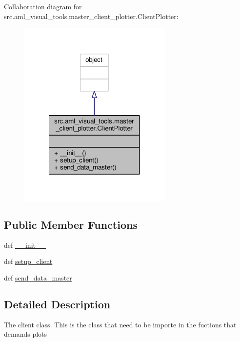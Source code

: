 Collaboration diagram for src.\-aml\-\_\-visual\-\_\-tools.\-master\-\_\-client\-\_\-plotter.\-Client\-Plotter\-:\nopagebreak
\begin{figure}[H]
\begin{center}
\leavevmode
\includegraphics[width=218pt]{classsrc_1_1aml__visual__tools_1_1master__client__plotter_1_1_client_plotter__coll__graph}
\end{center}
\end{figure}
\subsection*{Public Member Functions}
\begin{DoxyCompactItemize}
\item 
def \hyperlink{classsrc_1_1aml__visual__tools_1_1master__client__plotter_1_1_client_plotter_a96dd59ca5b4b85bc1ab44e0b443ad14a}{\-\_\-\-\_\-init\-\_\-\-\_\-}
\item 
def \hyperlink{classsrc_1_1aml__visual__tools_1_1master__client__plotter_1_1_client_plotter_ad2d1cb31335b31b06afdd09ebd8d3fae}{setup\-\_\-client}
\item 
def \hyperlink{classsrc_1_1aml__visual__tools_1_1master__client__plotter_1_1_client_plotter_ae64a9d9aefd20da34d97d07c265ce056}{send\-\_\-data\-\_\-master}
\end{DoxyCompactItemize}


\subsection{Detailed Description}
\begin{DoxyVerb}The client class. This is the class
that need to be importe in the fuctions that
demands plots
\end{DoxyVerb}
 

